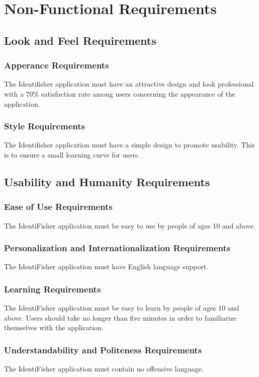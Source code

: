 \documentclass{article}
\begin{document}
\section{Non-Functional Requirements}

\subsection{Look and Feel Requirements}
\subsubsection{Apperance Requirements}
The Identifisher application must have an attractive design and look professional with a 70\% satisfaction rate among users concerning the appearance of the application.
\subsubsection{Style Requirements}
The Identifisher application must have a simple design to promote usability. This is to ensure a small learning curve for users.

\subsection{Usability and Humanity Requirements}
\subsubsection{Ease of Use Requirements}
The IdentiFisher application must be easy to use by people of ages 10 and above.
\subsubsection{Personalization and Internationalization Requirements}
The IdentiFisher application must have English language support.
\subsubsection{Learning Requirements}
The IdentiFisher application must be easy to learn by people of ages 10 and above. Users should take no longer than five minutes in order to familiarize themselves with the application.
\subsubsection{Understandability and Politeness Requirements}
The IdentiFisher application must contain no offensive language.
\end{document}
